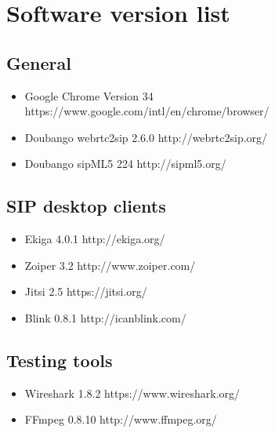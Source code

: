 \chapter{Software version list}

\section{General}
\begin{itemize}
\item Google Chrome Version 34\newline
https://www.google.com/intl/en/chrome/browser/
\item Doubango webrtc2sip 2.6.0\newline
http://webrtc2sip.org/
\item Doubango sipML5 224\newline
http://sipml5.org/
\end{itemize}

\section{SIP desktop clients}
\begin{itemize}
\item Ekiga 4.0.1\newline
http://ekiga.org/
\item Zoiper 3.2\newline
http://www.zoiper.com/
\item Jitsi 2.5\newline
https://jitsi.org/
\item Blink 0.8.1\newline
http://icanblink.com/
\end{itemize}

\section{Testing tools}
\begin{itemize}
\item Wireshark 1.8.2\newline
https://www.wireshark.org/
\item FFmpeg 0.8.10\newline
http://www.ffmpeg.org/
\end{itemize}